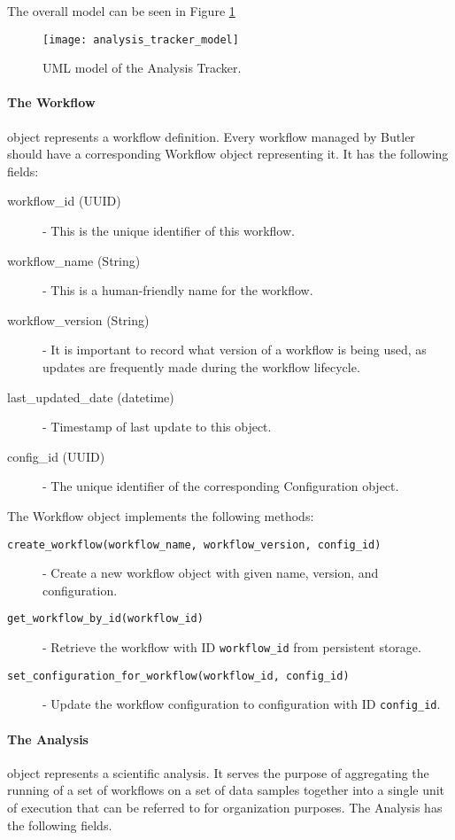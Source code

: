 The overall model can be seen in Figure \ref{fig:analysis_tracker_model}

\begin{figure}[h!]
\texttt{[image: analysis\_tracker\_model]}
\centering
\caption {UML model of the Analysis Tracker.}
\label{fig:analysis_tracker_model}
\end{figure}

\paragraph{The Workflow} object represents a workflow definition. Every workflow managed by Butler should have a corresponding Workflow object representing it. It has the following fields:

\begin{description}
\item [workflow\_id (UUID)] - This is the unique identifier of this workflow.
\item [workflow\_name (String)] - This is a human-friendly name for the workflow.
\item [workflow\_version (String)] - It is important to record what version of a workflow is being used, as updates are frequently made during the workflow lifecycle.
\item [last\_updated\_date (datetime)] - Timestamp of last update to this object.
\item [config\_id (UUID)] - The unique identifier of the corresponding Configuration object.
\end{description}

The Workflow object implements the following methods:

\begin{description}
\item [\texttt{create_workflow(workflow_name, workflow_version, config_id)}] - Create a new workflow object with given name, version, and configuration.
\item [\texttt{get_workflow_by_id(workflow_id)}] - Retrieve the workflow with ID \texttt{workflow_id} from persistent storage.
\item [\texttt{set_configuration_for_workflow(workflow_id, config_id)}] - Update the workflow configuration to configuration with ID \texttt{config_id}.
\end{description}

\paragraph{The Analysis} object represents a scientific analysis. It serves the purpose of aggregating the running of a set of workflows on a set of data samples together into a single unit of execution that can be referred to for organization purposes. The Analysis has the following fields.

